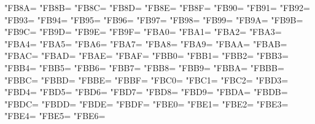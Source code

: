 \XeTeXcharclass"FB8A=\KclassArabU
\XeTeXcharclass"FB8B=\KclassArabU
\XeTeXcharclass"FB8C=\KclassArabU
\XeTeXcharclass"FB8D=\KclassArabU
\XeTeXcharclass"FB8E=\KclassArabU
\XeTeXcharclass"FB8F=\KclassArabU
\XeTeXcharclass"FB90=\KclassArabU
\XeTeXcharclass"FB91=\KclassArabU
\XeTeXcharclass"FB92=\KclassArabU
\XeTeXcharclass"FB93=\KclassArabU
\XeTeXcharclass"FB94=\KclassArabU
\XeTeXcharclass"FB95=\KclassArabU
\XeTeXcharclass"FB96=\KclassArabU
\XeTeXcharclass"FB97=\KclassArabU
\XeTeXcharclass"FB98=\KclassArabU
\XeTeXcharclass"FB99=\KclassArabU
\XeTeXcharclass"FB9A=\KclassArabU
\XeTeXcharclass"FB9B=\KclassArabU
\XeTeXcharclass"FB9C=\KclassArabU
\XeTeXcharclass"FB9D=\KclassArabU
\XeTeXcharclass"FB9E=\KclassArabU
\XeTeXcharclass"FB9F=\KclassArabU
\XeTeXcharclass"FBA0=\KclassArabU
\XeTeXcharclass"FBA1=\KclassArabU
\XeTeXcharclass"FBA2=\KclassArabU
\XeTeXcharclass"FBA3=\KclassArabU
\XeTeXcharclass"FBA4=\KclassArabU
\XeTeXcharclass"FBA5=\KclassArabU
\XeTeXcharclass"FBA6=\KclassArabU
\XeTeXcharclass"FBA7=\KclassArabU
\XeTeXcharclass"FBA8=\KclassArabU
\XeTeXcharclass"FBA9=\KclassArabU
\XeTeXcharclass"FBAA=\KclassArabU
\XeTeXcharclass"FBAB=\KclassArabU
\XeTeXcharclass"FBAC=\KclassArabU
\XeTeXcharclass"FBAD=\KclassArabU
\XeTeXcharclass"FBAE=\KclassArabU
\XeTeXcharclass"FBAF=\KclassArabU
\XeTeXcharclass"FBB0=\KclassArabU
\XeTeXcharclass"FBB1=\KclassArabU
\XeTeXcharclass"FBB2=\KclassArabU
\XeTeXcharclass"FBB3=\KclassArabU
\XeTeXcharclass"FBB4=\KclassArabU
\XeTeXcharclass"FBB5=\KclassArabU
\XeTeXcharclass"FBB6=\KclassArabU
\XeTeXcharclass"FBB7=\KclassArabU
\XeTeXcharclass"FBB8=\KclassArabU
\XeTeXcharclass"FBB9=\KclassArabU
\XeTeXcharclass"FBBA=\KclassArabU
\XeTeXcharclass"FBBB=\KclassArabU
\XeTeXcharclass"FBBC=\KclassArabU
\XeTeXcharclass"FBBD=\KclassArabU
\XeTeXcharclass"FBBE=\KclassArabU
\XeTeXcharclass"FBBF=\KclassArabU
\XeTeXcharclass"FBC0=\KclassArabU
\XeTeXcharclass"FBC1=\KclassArabU
\XeTeXcharclass"FBC2=\KclassArabU
\XeTeXcharclass"FBD3=\KclassArabU
\XeTeXcharclass"FBD4=\KclassArabU
\XeTeXcharclass"FBD5=\KclassArabU
\XeTeXcharclass"FBD6=\KclassArabU
\XeTeXcharclass"FBD7=\KclassArabU
\XeTeXcharclass"FBD8=\KclassArabU
\XeTeXcharclass"FBD9=\KclassArabU
\XeTeXcharclass"FBDA=\KclassArabU
\XeTeXcharclass"FBDB=\KclassArabU
\XeTeXcharclass"FBDC=\KclassArabU
\XeTeXcharclass"FBDD=\KclassArabU
\XeTeXcharclass"FBDE=\KclassArabU
\XeTeXcharclass"FBDF=\KclassArabU
\XeTeXcharclass"FBE0=\KclassArabU
\XeTeXcharclass"FBE1=\KclassArabU
\XeTeXcharclass"FBE2=\KclassArabU
\XeTeXcharclass"FBE3=\KclassArabU
\XeTeXcharclass"FBE4=\KclassArabU
\XeTeXcharclass"FBE5=\KclassArabU
\XeTeXcharclass"FBE6=\KclassArabU
